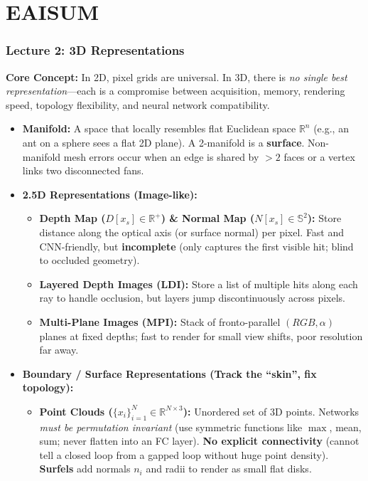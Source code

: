 \documentclass[11pt,a4paper]{article}
\theoremstyle{definition}
\theoremstyle{plain}
\theoremstyle{remark}
\begin{document}
\part{EAISUM}

\section*{\textcolor{primary}{Lecture 2: 3D Representations}}
\textbf{Core Concept:} In 2D, pixel grids are universal. In 3D, there is \emph{no single best representation}---each is a compromise between acquisition, memory, rendering speed, topology flexibility, and neural network compatibility.

\begin{itemize}
    \item \textbf{Manifold:} A space that locally resembles flat Euclidean space $\mathbb{R}^n$ (e.g., an ant on a sphere sees a flat 2D plane). A 2-manifold is a \textbf{surface}. Non-manifold mesh errors occur when an edge is shared by $>2$ faces or a vertex links two disconnected fans.
    \item \textbf{2.5D Representations (Image-like):}
    \begin{itemize}
        \item \textbf{Depth Map ($D[x_s] \in \mathbb{R}^+$) \& Normal Map ($N[x_s] \in \mathbb{S}^2$):} Store distance along the optical axis (or surface normal) per pixel. Fast and CNN-friendly, but \textbf{incomplete} (only captures the first visible hit; blind to occluded geometry).
        \item \textbf{Layered Depth Images (LDI):} Store a list of multiple hits along each ray to handle occlusion, but layers jump discontinuously across pixels.
        \item \textbf{Multi-Plane Images (MPI):} Stack of fronto-parallel $(RGB, \alpha)$ planes at fixed depths; fast to render for small view shifts, poor resolution far away.
    \end{itemize}
    \item \textbf{Boundary / Surface Representations (Track the ``skin'', fix topology):}
    \begin{itemize}
        \item \textbf{Point Clouds ($\{x_i\}_{i=1}^N \in \mathbb{R}^{N \times 3}$):} Unordered set of 3D points. Networks \emph{must be permutation invariant} (use symmetric functions like $\max$, mean, sum; never flatten into an FC layer). \textbf{No explicit connectivity} (cannot tell a closed loop from a gapped loop without huge point density). \textbf{Surfels} add normals $n_i$ and radii to render as small flat disks.

\end{itemize}
\end{itemize}
\end{document}
